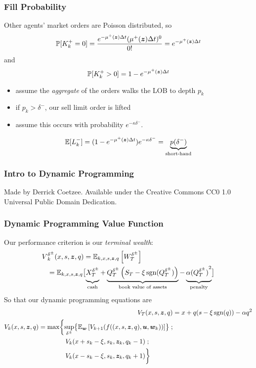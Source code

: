 \begin{frame}
\frametitle{Fill Probability}
Other agents' market orders are Poisson distributed, so
\[ \mathbb{P} [ K_k^+ = 0] = \frac{e^{-\mu^+ (\bm{z}) \Delta t} (\mu^+ (\bm{z}) \Delta t)^0}{0!} = e^{-\mu^+ (\bm{z}) \Delta t} \]
and
\[ \mathbb{P} [ K_k^+ > 0] = 1 - e^{-\mu^+ (\bm{z}) \Delta t} \]
\begin{itemize}
\item assume the \textit{aggregate} of the orders walks the LOB to depth $p_k$
\item if $p_k > \delta^-$, our sell limit order is lifted
\item assume this occurs with probability $e^{-\kappa \delta^-}$.
\end{itemize}
\[ \mathbb{E} [ L_k^- ] = ( 1 - e^{-\mu^+ (\bm{z}) \Delta t} ) e^{-\kappa \delta^-} = \underbrace{p(\delta^-)}_{\text{short-hand}} \]
\end{frame}

\begin{frame}
\frametitle{Intro to Dynamic Programming}
{\tiny Made by Derrick Coetzee. Available under the Creative Commons CC0 1.0 Universal Public Domain Dedication.}
\end{frame}

\begin{frame}
\frametitle{Dynamic Programming Value Function}
Our performance criterion is our \emph{terminal wealth}:
\[
\begin{aligned}
V&_k^{\delta^\pm} (x,s,\bz,q) = \E_{k,x,s,\bz,q} \left[ W_T^{\delta^\pm} \right] \\ 
& = \E_{k,x,s,\bz,q}\bigl[ 
\underbrace{\vphantom{\left( Q^{\btau, \delta}_t) \right)} X_T^{\delta^\pm}}_{\text{cash}}+ \underbrace{Q_T^{\delta^\pm}\left(S_T - \xi\sgn(Q_T^{\delta^\pm})\right)}_{\text{book value of assets}} - \underbrace{\vphantom{\left( Q^{\btau, \delta}_t) \right)}\alpha {(Q_T^{\delta^\pm})}^2}_{\text{penalty}} \bigr]
\end{aligned}
\]
So that our dynamic programming equations are
\begin{align*}
V_T (x,s,\bz,q) & = x + q(s-\xi\sgn(q)) - \alpha q^2 \\
\begin{split}
V_k (x,s,\bz,q) & = \max \biggl\lbrace \sup_{\delta^\pm} \bigl\lbrace \E_{\bw} \left[ V_{k+1} (f((x,s,\bz,q),\bu,\bw_k)) \right] \bigr\rbrace \; ; \\
& \hphantom{{}={} \max \biggl\lbrace} V_k(x+s_k-\xi,s_k, \bz_k, q_k -1) \; ; \\
& \hphantom{{}={} \max \biggl\lbrace} V_k(x-s_k-\xi,s_k, \bz_k, q_k +1) \biggr\rbrace
\end{split}
\end{align*}
\end{frame}


